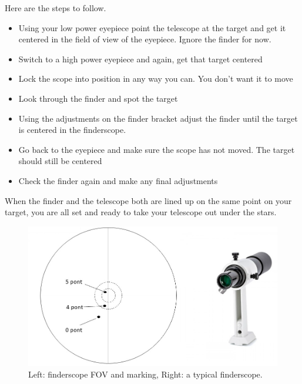 \documentclass[a4paper,12pt]{extarticle}
\begin{document}
Here are the steps to follow.

\begin{itemize}
	\item Using your low power eyepiece point the telescope at the target and get it centered in the field of view of the eyepiece. Ignore the finder for now.
	\item Switch to a high power eyepiece and again, get that target centered
	\item Lock the scope into position in any way you can. You don’t want it to move
	\item Look through the finder and spot the target
	\item Using the adjustments on the finder bracket adjust the finder until the target is centered in the finderscope.
	\item Go back to the eyepiece and make sure the scope has not moved. The target should still be centered
	\item Check the finder again and make any final adjustments
\end{itemize}

When the finder and the telescope both are lined up on the same point on your target, you are all set and ready to take your telescope out under the stars.

\begin{figure}[H]
	\centering
	\includegraphics[width=0.8\linewidth]{finderscope.png}
	\caption{Left: finderscope FOV and marking, Right: a typical finderscope.}
\end{figure}
\end{document}
